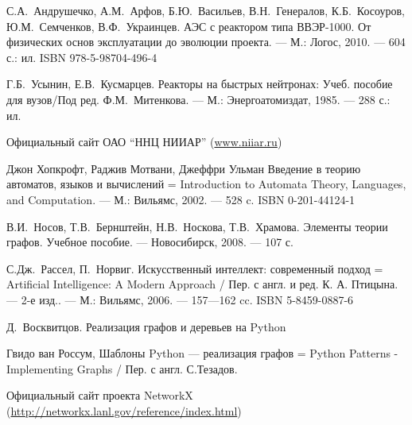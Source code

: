 \newpage
{}
\begin{thebibliography}{0}
С.А.~Андрушечко, А.М.~Арфов, Б.Ю.~Васильев, В.Н.~Генералов, К.Б.~Косоуров, Ю.М.~Семченков, В.Ф.~Украинцев. АЭС с реактором типа ВВЭР-1000. От физических основ эксплуатации до эволюции проекта. --- 
М.: Логос, 2010. --- 604 с.: ил.
ISBN 978-5-98704-496-4

Г.Б.~Усынин, Е.В.~Кусмарцев. Реакторы на быстрых нейтронах: Учеб. пособие для вузов/Под ред. Ф.М.~Митенкова. --- 
М.: Энергоатомиздат, 1985. --- 288 с.: ил.

Официальный сайт ОАО ``ННЦ НИИАР'' (\href{http://www.niiar.ru/}{www.niiar.ru})

Джон Хопкрофт, Раджив Мотвани, Джеффри Ульман Введение в теорию автоматов, языков и вычислений = Introduction to Automata Theory, Languages, and Computation. --- 
М.: Вильямс, 2002. --- 528 c. 
ISBN 0-201-44124-1

В.И.~Носов, Т.В.~Бернштейн, Н.В.~Носкова, Т.В.~Храмова. Элементы теории графов. Учебное пособие. ---
Новосибирск, 2008. --- 107 с.

С.Дж.~Рассел, П.~Норвиг. Искусственный интеллект: современный подход = Artificial Intelligence: A Modern Approach / Пер. с англ. и ред. К. А. Птицына. --- 2-е изд.. --- 
М.: Вильямс, 2006. --- 157—162 cc.
ISBN 5-8459-0887-6

Д.~Восквитцов. Реализация графов и деревьев на Python

Гвидо ван Россум, Шаблоны Python --- реализация графов = Python Patterns - Implementing Graphs / Пер. с англ. С.Тезадов. 

Официальный сайт проекта NetworkX (\href{http://networkx.lanl.gov/reference/index.html}{http://networkx.lanl.gov/reference/index.html})
\end{thebibliography}
